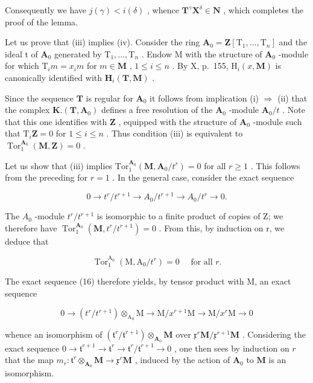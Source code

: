 Consequently we have \(j(\gamma) < i(\delta)\) , whence \(\mathbf{T}^{\gamma}\mathbf{X}^{\delta} \in \mathbf{N}\) , which completes the proof of the lemma.

Let us prove that (iii) implies (iv). Consider the ring \(\mathbf{A}_0 = \mathbf{Z}[\mathrm{T}_1, \ldots, \mathrm{T}_n]\) and the ideal t of \(\mathbf{A}_0\) generated by \(\mathrm{T}_1, \ldots, \mathrm{T}_n\) . Endow M with the structure of \(\mathbf{A}_0\) -module for which \(\mathrm{T}_i m = x_i m\) for \(m \in \mathbf{M}\) , \(1 \leqslant i \leqslant n\) . By X, p.~155, \(\mathrm{H}_i(x, \mathbf{M})\) is canonically identified with \(\mathbf{H}_i(\mathbf{T}, \mathbf{M})\) .

Since the sequence \(\mathbf{T}\) is regular for \(\mathbf{A}_{0}\) it follows from implication (i) \(\Rightarrow\) (ii) that the complex \(\mathbf{K}.\left(\mathbf{T},\mathbf{A}_{0}\right)\) defines a free resolution of the \(\mathbf{A}_{0}\) -module \(\mathbf{A}_{0}/t\) . Note that this one identifies with \(\mathbf{Z}\) , equipped with the structure of \(\mathbf{A}_{0}\) -module such that \(\mathrm{T}_{i}\mathbf{Z}=0\) for \(1\leqslant i\leqslant n\) . Thus condition (iii) is equivalent to \(\operatorname{Tor}_{1}^{\mathbf{A}_{0}}(\mathbf{M},\mathbf{Z})=0\) .

Let us show that (iii) implies \(\mathrm{Tor}_{1}^{\mathbf{A}_{0}}(\mathbf{M},\mathbf{A}_{0}/t^{r})=0\) for all \(r\geqslant1\) . This follows from the preceding for \(r=1\) . In the general case, consider the exact sequence

\[
0 \rightarrow t ^ {r} / t ^ {r + 1} \rightarrow A _ {0} / t ^ {r + 1} \rightarrow A _ {0} / t ^ {r} \rightarrow 0.\tag{16}
\]

The \(A_{0}\) -module \(t^{r}/t^{r+1}\) is isomorphic to a finite product of copies of Z; we therefore have \(\operatorname{Tor}_{1}^{\mathbf{A}_{0}}(\mathbf{M}, t^{r}/t^{r+1}) = 0\) . From this, by induction on r, we deduce that

\[
\operatorname{Tor} _ {1} ^ {\mathrm{A} _ {0}} \left(\mathrm{M}, \mathrm{A} _ {0} / t ^ {r}\right) = 0 \quad \text { for   all } r.
\]

The exact sequence (16) therefore yields, by tensor product with M, an exact sequence

\[
0 \rightarrow (t ^ {r} / t ^ {r + 1}) \otimes_ {\mathrm{A} _ {0}} \mathrm{M} \rightarrow \mathrm{M} / x ^ {r + 1} \mathrm{M} \rightarrow \mathrm{M} / x ^ {r} \mathrm{M} \rightarrow 0\tag{17}
\]

whence an isomorphism of \((\mathfrak{t}^r /\mathfrak{t}^{r + 1})\otimes_{\mathbf{A}_0}\mathbf{M}\) over \(\mathfrak{x}^r\mathbf{M} / \mathfrak{x}^{r + 1}\mathbf{M}\) . Considering the exact sequence \(0\to \mathfrak{t}^{r + 1}\to \mathfrak{t}^r\to \mathfrak{t}^r /\mathfrak{t}^{r + 1}\to 0\) , one then sees by induction on \(r\) that the map \(m_r:\mathfrak{t}^r\otimes_{\mathbf{A}_0}\mathbf{M}\rightarrow \mathfrak{x}^r\mathbf{M}\) , induced by the action of \(\mathbf{A}_0\) to \(\mathbf{M}\) is an isomorphism.


